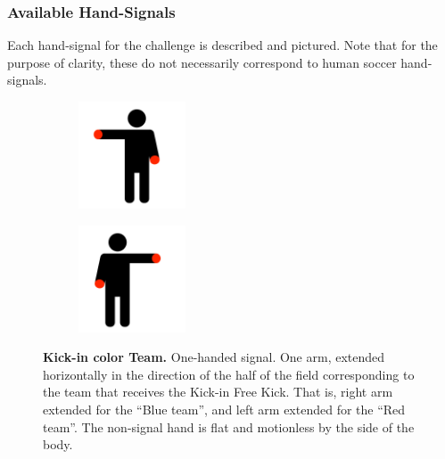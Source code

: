     \subsubsection{Available Hand-Signals}

        Each hand-signal for the challenge is described and pictured. Note that for the purpose of clarity, these do not necessarily correspond to human soccer hand-signals.

        \begin{figure}[ht!]
            \centering
            \begin{subfigure}{.33\textwidth}
              \includegraphics[height=120px]{figs/referee-signals/kick-in.png}
            \end{subfigure}
            \begin{subfigure}{.33\textwidth}
              \includegraphics[height=120px]{figs/referee-signals/kick-in-flipped.png}
            \end{subfigure}
            \caption{\textbf{Kick-in \textlangle{}color\textrangle{} Team.} One-handed signal. One arm, extended horizontally in the direction of the half of the field corresponding to the team that receives the Kick-in Free Kick. That is, right arm extended for the ``Blue team'', and left arm extended for the ``Red team''. The non-signal hand is flat and motionless by the side of the body.}
        \end{figure}
            
